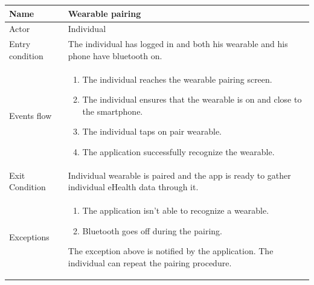 \begin{tabular}{|l|p{11cm}|}
    \hline
    Name & Wearable pairing
    \\ \hline
    Actor & Individual
    \\ \hline 
    Entry condition & The individual has logged in and both his wearable and his phone have bluetooth on.
    \\ \hline
    Events flow &
    \begin{enumerate}
    \item The individual reaches the wearable pairing screen.
    \item The individual ensures that the wearable is on and close to the smartphone.
    \item The individual taps on pair wearable.
    \item The application successfully recognize the wearable.
    \end{enumerate}
     \\ \hline
     Exit Condition & Individual wearable is paired and the app is ready to gather individual eHealth data through it.
     \\
    \hline
    Exceptions &
        \begin{enumerate}
    \item The application isn't able to recognize a wearable. 
   	\item Bluetooth goes off during the pairing.
    \end{enumerate}
    The exception above is notified by the application. The individual can repeat the pairing procedure.
      \\
    \hline

\end{tabular}



